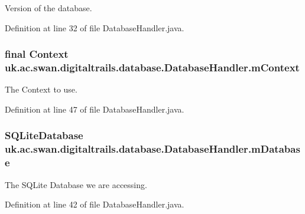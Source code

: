Version of the database. 



Definition at line 32 of file Database\+Handler.\+java.

\hypertarget{classuk_1_1ac_1_1swan_1_1digitaltrails_1_1database_1_1_database_handler_ac37b8a11a4e6c0dc464553464ad2039c}{
\subsubsection[{m\+Context}]{\setlength{\rightskip}{0pt plus 5cm}final Context uk.\+ac.\+swan.\+digitaltrails.\+database.\+Database\+Handler.\+m\+Context\hspace{0.3cm}{\ttfamily [private]}}}\label{classuk_1_1ac_1_1swan_1_1digitaltrails_1_1database_1_1_database_handler_ac37b8a11a4e6c0dc464553464ad2039c}


The Context to use. 



Definition at line 47 of file Database\+Handler.\+java.

\hypertarget{classuk_1_1ac_1_1swan_1_1digitaltrails_1_1database_1_1_database_handler_a20f6dc13104636d3be5dd1433020b5dc}{
\subsubsection[{m\+Database}]{\setlength{\rightskip}{0pt plus 5cm}S\+Q\+Lite\+Database uk.\+ac.\+swan.\+digitaltrails.\+database.\+Database\+Handler.\+m\+Database\hspace{0.3cm}{\ttfamily [private]}}}\label{classuk_1_1ac_1_1swan_1_1digitaltrails_1_1database_1_1_database_handler_a20f6dc13104636d3be5dd1433020b5dc}


The S\+Q\+Lite Database we are accessing. 



Definition at line 42 of file Database\+Handler.\+java.

